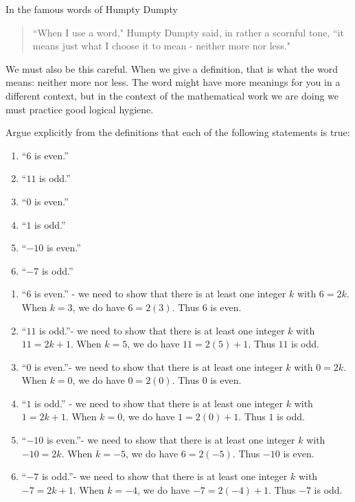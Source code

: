 In the famous words of Humpty Dumpty

\begin{quote}
	``When I use a word," Humpty Dumpty said, in rather a scornful tone, ``it means just what I choose it to mean - neither more nor less."
\end{quote}

We must also be this careful. When we give a definition, that is what the word means:  neither more nor less.  The word might have more meanings for you in a different context, but in the context of the mathematical work we are doing we must practice good logical hygiene.

\begin{xca}
	Argue explicitly from the definitions that each of the following statements is true:
	
	\begin{enumerate}
			\item ``$6$ is even.''
			\item ``$11$ is odd.''
			\item ``$0$ is even.''
			\item ``$1$ is odd.''
			\item ``$-10$ is even.''
			\item ``$-7$ is odd.''
		\end{enumerate}
	\end{xca}

\begin{solutions}
	
	\begin{enumerate}
		\item ``$6$ is even.'' - we need to show that there is at least one integer $k$ with $6 = 2k$.  When $k = 3$, we do have $6 = 2(3)$.  Thus $6$ is even.
		\item ``$11$ is odd.''- we need to show that there is at least one integer $k$ with $11 = 2k+1$.  When $k = 5$, we do have $11 = 2(5)+1$.  Thus $11$ is odd.
		\item ``$0$ is even.''- we need to show that there is at least one integer $k$ with $0 = 2k$.  When $k = 0$, we do have $0 = 2(0)$.  Thus $0$ is even.
		\item ``$1$ is odd.'' - we need to show that there is at least one integer $k$ with $1 = 2k+1$.  When $k = 0$, we do have $1 = 2(0)+1$.  Thus $1$ is odd.
		\item ``$-10$ is even.''- we need to show that there is at least one integer $k$ with $-10 = 2k$.  When $k = -5$, we do have $6 = 2(-5)$.  Thus $-10$ is even.
		\item ``$-7$ is odd.''- we need to show that there is at least one integer $k$ with $-7 = 2k+1$.  When $k = -4$, we do have $-7 = 2(-4)+1$.  Thus $-7$ is odd.
	\end{enumerate}

\end{solutions}

